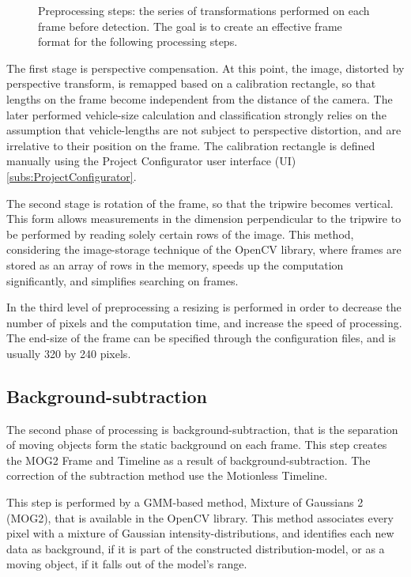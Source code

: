 \begin{figure}[!h]
	\centering
	
	\caption{Preprocessing steps: the series of transformations performed on each frame before detection. The goal is to create an effective frame format for the following processing steps.\label{fig:transforms}}
\end{figure}

The first stage is perspective compensation.
At this point, the image, distorted by perspective transform, is remapped based on a calibration rectangle, so that lengths on the frame become independent from the distance of the camera.
The later performed vehicle-size calculation and classification strongly relies on the assumption that vehicle-lengths are not subject to perspective distortion, and are irrelative to their position on the frame.
The calibration rectangle is defined manually using the Project Configurator user interface (UI)\ref{subs:ProjectConfigurator}.

The second stage is rotation of the frame, so that the tripwire becomes vertical.
This form allows measurements in the dimension perpendicular to the tripwire to be performed by reading solely certain rows of the image.
This method, considering the image-storage technique of the OpenCV library, where frames are stored as an array of rows in the memory, speeds up the computation significantly, and simplifies searching on frames.

In the third level of preprocessing a resizing is performed in order to decrease the number of pixels and the computation time, and increase the speed of processing.
The end-size of the frame can be specified through the configuration files, and is usually 320 by 240 pixels.
\subsection{Background-subtraction}
The second phase of processing is background-subtraction, that is the separation of moving objects form the static background on each frame.
This step creates the MOG2 Frame and Timeline as a result of background-subtraction.
The correction of the subtraction method use the Motionless Timeline.

This step is performed by a GMM-based method, Mixture of Gaussians 2 (MOG2), that is available in the OpenCV library.
This method associates every pixel with a mixture of Gaussian intensity-distributions, and identifies each new data as background, if it is part of the constructed distribution-model, or as a moving object, if it falls out of the model's range.

